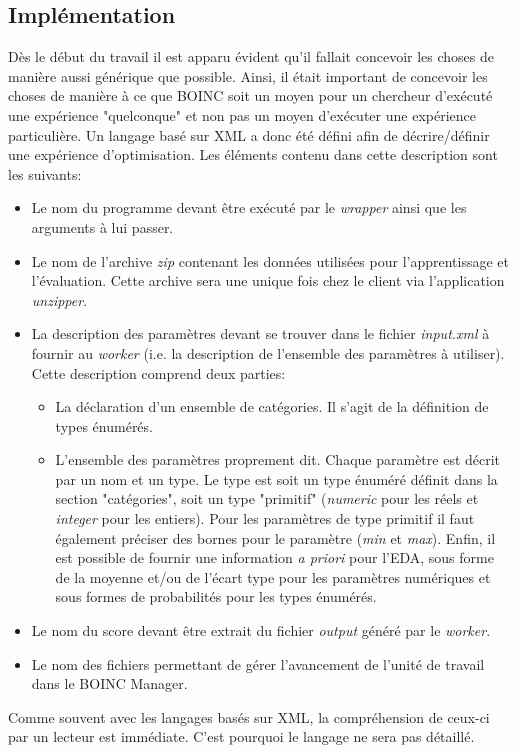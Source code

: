\documentclass[a4paper, 11pt]{report}
\begin{document}
\subsection{Implémentation}
Dès le début du travail il est apparu évident qu'il fallait concevoir les choses de manière aussi générique que possible. Ainsi, il était important de concevoir les choses de manière à ce que \textsc{BOINC} soit un moyen pour un chercheur d'exécuté une expérience "quelconque" et non pas un moyen d'exécuter une expérience particulière. Un langage basé sur XML a donc été défini afin de décrire/définir une expérience d'optimisation. Les éléments contenu dans cette description sont les suivants:
\begin{itemize}
\item Le nom du programme devant être exécuté par le \textit{wrapper} ainsi que les arguments à lui passer.
\item Le nom de l'archive \textit{zip} contenant les données utilisées pour l'apprentissage et l'évaluation. %
Cette archive sera une unique fois chez le client via l'application \textit{unzipper}.
\item La description des paramètres devant se trouver dans le fichier \textit{input.xml} à fournir au \textit{worker} (i.e. la description de l'ensemble des paramètres à utiliser). Cette description comprend deux parties:
	\begin{itemize}
	\item La déclaration d'un ensemble de catégories. Il s'agit de la définition de types énumérés. %
	\item L'ensemble des paramètres proprement dit. Chaque paramètre est décrit par un nom et un type. Le type est soit un type énuméré définit dans la section "catégories", soit un type "primitif" (\textit{numeric} pour les réels et \textit{integer} pour les entiers).  Pour les paramètres de type primitif il faut également préciser des bornes pour le paramètre (\textit{min} et \textit{max}). Enfin, il est possible de fournir une information \textit{a priori} pour l'EDA, sous forme de la moyenne et/ou de l'écart type pour les paramètres numériques et sous formes de probabilités pour les types énumérés.
	\end{itemize}
\item Le nom du score devant être extrait du fichier \textit{output} généré par le \textit{worker}.
\item Le nom des fichiers permettant de gérer l'avancement de l'unité de travail dans le \textsc{BOINC} Manager. %
\end{itemize}
Comme souvent avec les langages basés sur XML, la compréhension de ceux-ci par un lecteur est immédiate. C'est pourquoi le langage ne sera pas détaillé. %
\end{document}
